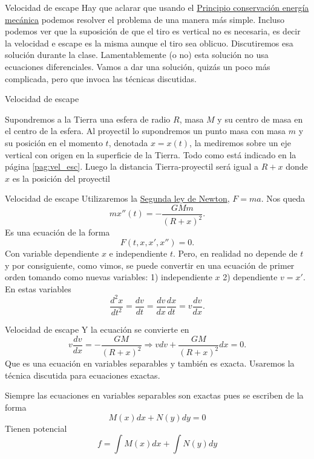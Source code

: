 \documentclass[handout,hyperref={colorlinks=true}]{beamer}
\begin{document}
\begin{frame}{Velocidad de escape}
Hay que aclarar que usando el \href{https://docs.google.com/file/d/0B80iJ0HgObRRWll6MlJFSjFNMGc/edit}{Principio conservación energía mecánica} podemos resolver
el problema de una manera más simple. Incluso podemos ver que la suposición de que el tiro es vertical no es necesaria, es decir la velocidad e escape es la misma aunque
el tiro sea oblicuo. Discutiremos esa solución durante la clase. Lamentablemente (o no)  esta solución no usa ecuaciones diferenciales.
Vamos a dar una solución, quizás un poco más complicada, pero que invoca las técnicas 
discutidas.

 

\end{frame}

\begin{frame}{Velocidad de escape}
 

Supondremos a la Tierra una esfera de radio $R$, masa $M$ y su centro de masa en el centro de la esfera.   Al proyectil lo supondremos un punto masa 
con masa $m$ y su posición en el momento $t$, denotada $x=x(t)$, la mediremos sobre un eje vertical con origen en la superficie de la Tierra.  Todo como está indicado en la página \ref{pag:vel_esc}. 
Luego la distancia Tierra-proyectil será igual a $R+x$ donde $x$ es la posición del proyectil


\end{frame}

\begin{frame}{Velocidad de escape}
Utilizaremos la \href{http://es.wikipedia.org/wiki/Leyes_de_Newton\#Segunda_ley_de_Newton_o_ley_de_fuerza}{Segunda ley de Newton}, $F=ma$. Nos queda
\[mx''(t)=-\frac{GMm}{(R+x)^2}.\]
Es una ecuación de la forma
\[F(t,x,x',x'')=0.\]
Con variable dependiente $x$ e independiente $t$. Pero, en realidad no depende de $t$ y por consiguiente, como vimos, se puede convertir en una ecuación de primer orden
tomando como nuevas variables: 1) independiente $x$ 2) dependiente $v=x'$. En estas variables
\[\frac{d^2x}{dt^2}=\frac{dv}{dt}=\frac{dv}{dx}\frac{dx}{dt}=v\frac{dv}{dx}.\]


\end{frame}

\begin{frame}{Velocidad de escape}
Y la ecuación se convierte en
\[v\frac{dv}{dx}=-\frac{GM}{(R+x)^2}\Longrightarrow vdv+\frac{GM}{(R+x)^2}dx=0.\]
Que es una ecuación en variables separables y también es exacta. Usaremos la técnica discutida para 
ecuaciones exactas. 

Siempre las ecuaciones en variables separables son exactas pues se escriben de la forma
\[M(x)dx+N(y)dy=0\]
Tienen potencial
\[f=\int M(x)dx +\int N(y)dy\]


\end{frame}
\end{document}

